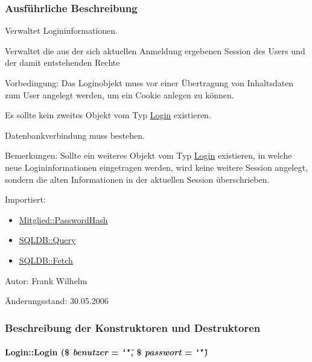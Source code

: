 \subsubsection{Ausf\"{u}hrliche Beschreibung}
Verwaltet Logininformationen. 

Verwaltet die aus der sich aktuellen Anmeldung ergebenen Session des Users und der damit entstehenden Rechte \begin{Desc}
\item[Vorbedingung:]Das Loginobjekt muss vor einer Übertragung von Inhaltsdaten zum User angelegt werden, um ein Cookie anlegen zu können. 

Es sollte kein zweites Objekt vom Typ \hyperlink{classLogin}{Login} existieren. 

Datenbankverbindung muss bestehen. \end{Desc}
\begin{Desc}
\item[Bemerkungen:]Sollte ein weiteres Objekt vom Typ \hyperlink{classLogin}{Login} existieren, in welche neue Logininformationen eingetragen werden, wird keine weitere Session angelegt, sondern die alten Informationen in der aktuellen Session überschrieben. \end{Desc}
\begin{Desc}
\item[Importiert:]\begin{itemize}
\item \hyperlink{classMitglied_9b13db80866c22bf992e73f2eb75e369}{Mitglied::Password\-Hash}\item \hyperlink{classSQLDB_fc6ffa8df50f68f07d9f5e3385b96d7a}{SQLDB::Query}\item \hyperlink{classSQLDB_a55c00ce1de0e50e0a58cae61892ba35}{SQLDB::Fetch}\end{itemize}
\end{Desc}
\begin{Desc}
\item[Autor:]Frank Wilhelm \end{Desc}
\begin{Desc}
\item[Änderungsstand:]30.05.2006 \end{Desc}




\subsubsection{Beschreibung der Konstruktoren und Destruktoren}
\hypertarget{classLogin_5d83c782459f6389f350666eb102974d}{
\paragraph[Login]{\setlength{\rightskip}{0pt plus 5cm}Login::Login (\$ {\em benutzer} = {\tt \char`\"{}\char`\"{}}, \$ {\em passwort} = {\tt \char`\"{}\char`\"{}})}\hfill}
\label{classLogin_5d83c782459f6389f350666eb102974d}


